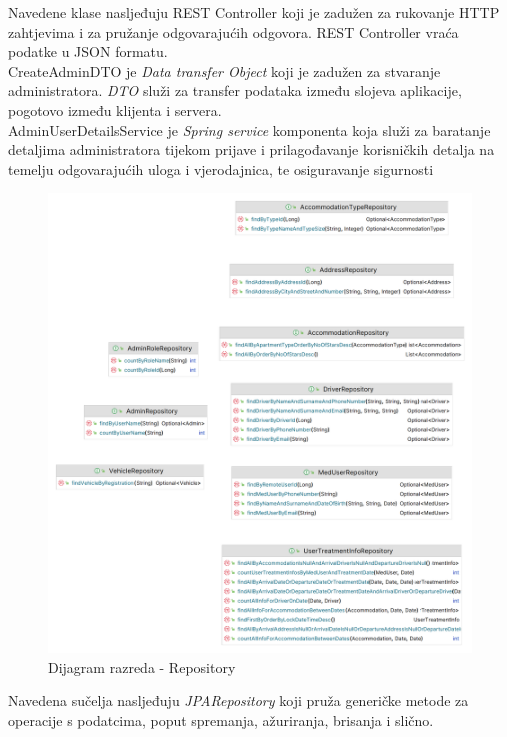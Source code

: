 			{Navedene klase nasljeđuju REST Controller koji je zadužen za rukovanje HTTP zahtjevima i za pružanje odgovarajućih odgovora. REST Controller vraća podatke u JSON formatu. \\ 
			CreateAdminDTO je \textit{Data transfer Object} koji je zadužen za stvaranje administratora. \textit{DTO} služi za transfer podataka između slojeva aplikacije, pogotovo između klijenta i servera. \\
			AdminUserDetailsService je \textit{Spring service} komponenta koja služi za baratanje detaljima administratora tijekom prijave i prilagođavanje korisničkih detalja na temelju odgovarajućih uloga i vjerodajnica, te osiguravanje sigurnosti}\\
			
			\begin{figure}[H]
				\includegraphics[width=\textwidth]{slike/dao.PNG}
				\caption{Dijagram razreda - Repository}
				\label{repositoryDiagram}
			\end{figure}
			
			{Navedena sučelja nasljeđuju \textit{JPARepository} koji pruža generičke metode za operacije s podatcima, poput spremanja, ažuriranja, brisanja i slično.}\\
			

